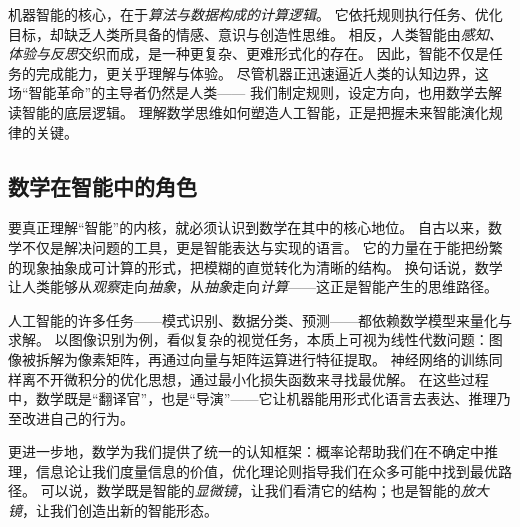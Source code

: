 机器智能的核心，在于\emph{算法与数据构成的计算逻辑}。
它依托规则执行任务、优化目标，却缺乏人类所具备的情感、意识与创造性思维。
相反，人类智能由\emph{感知、体验与反思}交织而成，是一种更复杂、更难形式化的存在。
因此，智能不仅是任务的完成能力，更关乎理解与体验。
尽管机器正迅速逼近人类的认知边界，这场“智能革命”的主导者仍然是人类——
我们制定规则，设定方向，也用数学去解读智能的底层逻辑。
理解数学思维如何塑造人工智能，正是把握未来智能演化规律的关键。

\subsection{数学在智能中的角色}


要真正理解“智能”的内核，就必须认识到数学在其中的核心地位。
自古以来，数学不仅是解决问题的工具，更是智能表达与实现的语言。
它的力量在于能把纷繁的现象抽象成可计算的形式，把模糊的直觉转化为清晰的结构。
换句话说，数学让人类能够从\emph{观察}走向\emph{抽象}，从\emph{抽象}走向\emph{计算}——这正是智能产生的思维路径。


人工智能的许多任务——模式识别、数据分类、预测——都依赖数学模型来量化与求解。
以图像识别为例，看似复杂的视觉任务，本质上可视为线性代数问题：图像被拆解为像素矩阵，再通过向量与矩阵运算进行特征提取。
神经网络的训练同样离不开微积分的优化思想，通过最小化损失函数来寻找最优解。
在这些过程中，数学既是“翻译官”，也是“导演”——它让机器能用形式化语言去表达、推理乃至改进自己的行为。


更进一步地，数学为我们提供了统一的认知框架：概率论帮助我们在不确定中推理，信息论让我们度量信息的价值，优化理论则指导我们在众多可能中找到最优路径。
可以说，数学既是智能的\emph{显微镜}，让我们看清它的结构；也是智能的\emph{放大镜}，让我们创造出新的智能形态。

